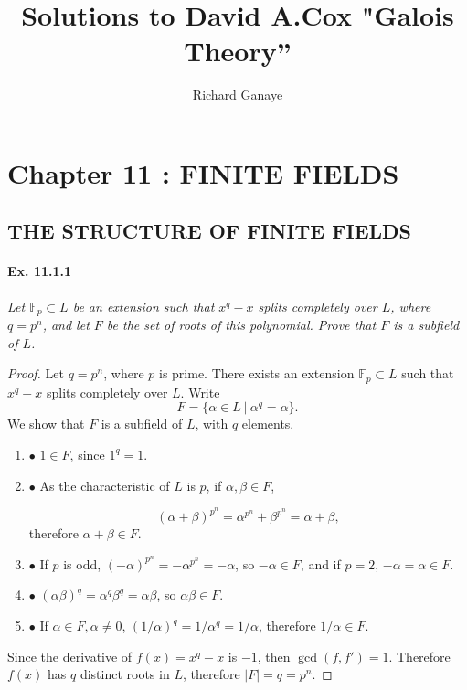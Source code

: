 \documentclass[11pt,a4paper]{article}
\title{Solutions to David A.Cox  "Galois Theory''}
\author{Richard Ganaye}
\newcommand{\be} {\begin{enumerate}}
\newcommand{\ee} {\end{enumerate}}
\newcommand{\F}{\mathbb{F}}
\begin{document}
\maketitle

\section{Chapter 11 : FINITE FIELDS}

\subsection{THE STRUCTURE OF FINITE FIELDS}
\paragraph{Ex. 11.1.1}

{\it Let $\F_p \subset L$ be an extension such that $x^q-x$ splits completely over $L$, where $q=p^n$, and let $F$ be the set of roots of this polynomial. Prove that $F$ is a subfield of $L$.
}

\begin{proof}
Let $q=p^n$, where $p$ is prime. There exists an extension $\F_p \subset L$ such that $x^q-x$ splits completely over $L$. Write
$$F = \{\alpha \in L \ \vert \ \alpha^q=\alpha\}.$$
We show that $F$ is a subfield of $L$, with $q$ elements.
\be
\item[$\bullet$] $1\in F$, since  $1^q=1$.

\item[$\bullet$]  As the characteristic of $L$ is $p$, if $\alpha,\beta \in F$,

$$(\alpha + \beta)^{p^n} = \alpha^{p^n}+\beta^{p^n} = \alpha+\beta,$$ therefore $\alpha+\beta \in F$.

\item[$\bullet$]  If $p$ is odd, $(-\alpha)^{p^n} = -\alpha^{p^n} = -\alpha$, so $-\alpha \in F$, and if $p=2$, $-\alpha = \alpha \in F$.

\item[$\bullet$]  $(\alpha \beta)^q = \alpha^q \beta^q = \alpha \beta$, so $\alpha \beta \in F$.

\item[$\bullet$]  If $\alpha \in F, \alpha \neq 0$, $(1/\alpha)^q = 1/ \alpha^q = 1 /\alpha$, therefore $1/\alpha \in F$.
\ee

Since the derivative of $f(x) = x^q-x$ is $-1$, then $\gcd(f,f')=1$. Therefore $f(x)$ has $q$ distinct roots in $L$, therefore $\vert F \vert = q = p^n$.
\end{proof}
\end{document}
